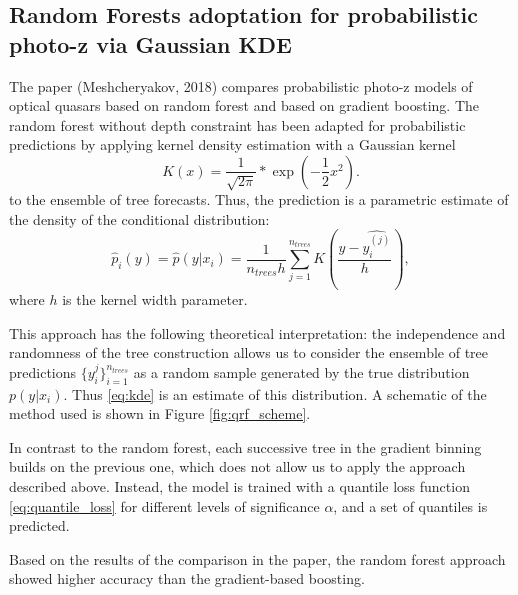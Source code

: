 \documentclass[fleqn,usenatbib]{mnras}
\begin{document}
\subsection{Random Forests adoptation for probabilistic photo-z via Gaussian KDE}
The paper (Meshcheryakov, 2018) compares probabilistic photo-z models of optical quasars based on random forest and based on gradient boosting. The random forest without depth constraint has been adapted for probabilistic predictions by applying kernel density estimation with a Gaussian kernel
\begin{equation}\label{eq:gaussian_kernel}
    K(x) = \frac{1}{\sqrt{2\pi}} * \exp{(-\frac{1}{2} x^2)}.
\end{equation}
to the ensemble of tree forecasts. Thus, the prediction is a parametric estimate of the density of the conditional distribution:
\begin{equation}\label{eq:kde}
    \hat{p}_i (y) = \hat{p}(y|x_i) = \frac{1}{n_{trees} h}\sum_{j=1}^{n_{trees}} K(\frac{y - \hat{y^{(j)}_i}}{h}),
\end{equation}
where $h$ is the kernel width parameter.

This approach has the following theoretical interpretation: the independence and randomness of the tree construction allows us to consider the ensemble of tree predictions $\{y^j_i\}_{i=1}^{n_{trees}}$ as a random sample generated by the true distribution $p(y|x_i)$. Thus \eqref{eq:kde} is an estimate of this distribution. A schematic of the method used is shown in Figure \ref{fig:qrf_scheme}.

In contrast to the random forest, each successive tree in the gradient binning builds on the previous one, which does not allow us to apply the approach described above. Instead, the model is trained with a quantile loss function \eqref{eq:quantile_loss} for different levels of significance $\alpha$, and a set of quantiles is predicted.

Based on the results of the comparison in the paper, the random forest approach showed higher accuracy than the gradient-based boosting.
\end{document}
